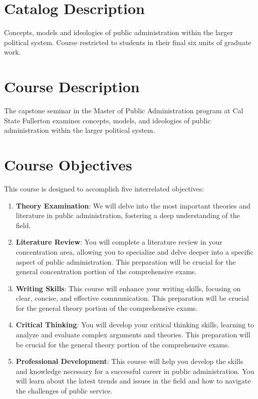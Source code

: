 \documentclass[12pt, letterpaper]{article}
\begin{document}
    \section{Catalog Description}
    Concepts, models and ideologies of public administration within the larger political system. Course restricted to students in their final six units of graduate work.
    
    \section{Course Description}
    The capstone seminar in the Master of Public Administration program at Cal State Fullerton examines concepts, models, and ideologies of public administration within the larger political system.
    
    \section{Course Objectives}
    This course is designed to accomplish five interrelated objectives:
    
    \begin{enumerate}
        \item \textbf{Theory Examination}: We will delve into the most important theories and literature in public administration, fostering a deep understanding of the field.
        \item \textbf{Literature Review}: You will complete a literature review in your concentration area, allowing you to specialize and delve deeper into a specific aspect of public administration. This preparation will be crucial for the general concentration portion of the comprehensive exams.
        \item \textbf{Writing Skills}: This course will enhance your writing skills, focusing on clear, concise, and effective communication. This preparation will be crucial for the general theory portion of the comprehensive exams.
        \item \textbf{Critical Thinking}: You will develop your critical thinking skills, learning to analyze and evaluate complex arguments and theories. This preparation will be crucial for the general theory portion of the comprehensive exams.
        \item \textbf{Professional Development}: This course will help you develop the skills and knowledge necessary for a successful career in public administration. You will learn about the latest trends and issues in the field and how to navigate the challenges of public service.
    \end{enumerate}
    
\end{document}
